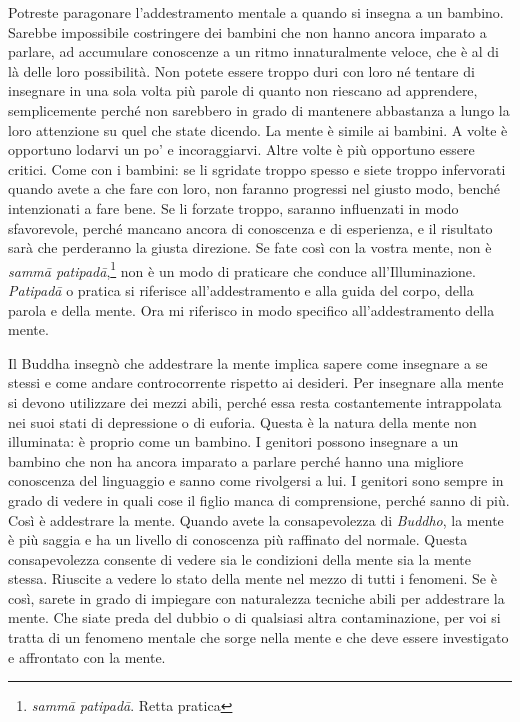 Potreste paragonare l'addestramento mentale a quando si insegna a un
bambino. Sarebbe impossibile costringere dei bambini che non hanno
ancora imparato a parlare, ad accumulare conoscenze a un ritmo
innaturalmente veloce, che è al di là delle loro possibilità. Non potete
essere troppo duri con loro né tentare di insegnare in una sola volta
più parole di quanto non riescano ad apprendere, semplicemente perché
non sarebbero in grado di mantenere abbastanza a lungo la loro
attenzione su quel che state dicendo. La mente è simile ai bambini. A
volte è opportuno lodarvi un po' e incoraggiarvi. Altre volte è più
opportuno essere critici. Come con i bambini: se li sgridate troppo
spesso e siete troppo infervorati quando avete a che fare con loro, non
faranno progressi nel giusto modo, benché intenzionati a fare bene. Se
li forzate troppo, saranno influenzati in modo sfavorevole, perché
mancano ancora di conoscenza e di esperienza, e il risultato sarà che
perderanno la giusta direzione. Se fate così con la vostra mente, non è
\emph{sammā patipadā},\footnote{\emph{sammā patipadā}. Retta pratica}
non è un modo di praticare che conduce all'Illuminazione.
\emph{Patipadā} o pratica si riferisce all'addestramento e alla guida
del corpo, della parola e della mente. Ora mi riferisco in modo
specifico all'addestramento della mente.

Il Buddha insegnò che addestrare la mente implica sapere come insegnare
a se stessi e come andare controcorrente rispetto ai desideri. Per
insegnare alla mente si devono utilizzare dei mezzi abili, perché essa
resta costantemente intrappolata nei suoi stati di depressione o di
euforia. Questa è la natura della mente non illuminata: è proprio come
un bambino. I genitori possono insegnare a un bambino che non ha ancora
imparato a parlare perché hanno una migliore conoscenza del linguaggio e
sanno come rivolgersi a lui. I genitori sono sempre in grado di vedere
in quali cose il figlio manca di comprensione, perché sanno di più. Così
è addestrare la mente. Quando avete la consapevolezza di \emph{Buddho},
la mente è più saggia e ha un livello di conoscenza più raffinato del
normale. Questa consapevolezza consente di vedere sia le condizioni
della mente sia la mente stessa. Riuscite a vedere lo stato della mente
nel mezzo di tutti i fenomeni. Se è così, sarete in grado di impiegare
con naturalezza tecniche abili per addestrare la mente. Che siate preda
del dubbio o di qualsiasi altra contaminazione, per voi si tratta di un
fenomeno mentale che sorge nella mente e che deve essere investigato e
affrontato con la mente.

